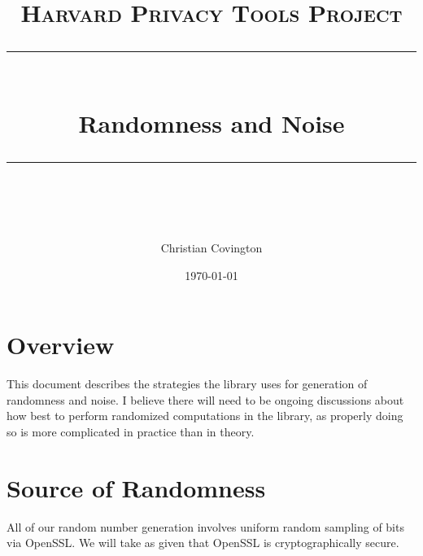 \documentclass[11pt]{scrartcl} %
\title{
	\normalfont\normalsize
	\textsc{Harvard Privacy Tools Project}\\ %
	\vspace{25pt} %
	\rule{\linewidth}{0.5pt}\\ %
	\vspace{20pt} %
	{\huge Randomness and Noise}\\ %
	\vspace{12pt} %
	\rule{\linewidth}{2pt}\\ %
	\vspace{12pt} %
}
\author{\LARGE Christian Covington} %
\date{\normalsize\today} %
\begin{document}
\maketitle

\section{Overview}
This document describes the strategies the library uses for generation of randomness and noise.
I believe there will need to be ongoing discussions about how best to perform randomized computations
in the library, as properly doing so is more complicated in practice than in theory.




\section{Source of Randomness}
All of our random number generation involves uniform random sampling of bits via OpenSSL.
We will take as given that OpenSSL is cryptographically secure.
\end{document}
